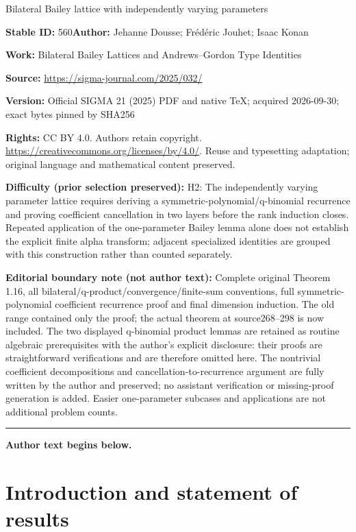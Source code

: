 \documentclass[11pt]{article}
\numberwithin{equation}{section}
\begin{document}
\begin{center}\Large Bilateral Bailey lattice with independently varying parameters\end{center}
\noindent\textbf{Stable ID:} 560\quad\textbf{Author:} Jehanne Dousse; Frédéric Jouhet; Isaac Konan\par
\noindent\textbf{Work:} Bilateral Bailey Lattices and Andrews–Gordon Type Identities\par
\noindent\textbf{Source:} \url{https://sigma-journal.com/2025/032/}\par
\noindent\textbf{Version:} Official SIGMA 21 (2025) PDF and native TeX; acquired 2026-09-30; exact bytes pinned by SHA256\par
\noindent\textbf{Rights:} CC BY 4.0. Authors retain copyright. \url{https://creativecommons.org/licenses/by/4.0/}. Reuse and typesetting adaptation; original language and mathematical content preserved.\par
\noindent\textbf{Difficulty (prior selection preserved):} {\CJKfont H2: The independently varying parameter lattice requires deriving a symmetric-polynomial/q-binomial recurrence and proving coefficient cancellation in two layers before the rank induction closes. Repeated application of the one-parameter Bailey lemma alone does not establish the explicit finite alpha transform; adjacent specialized identities are grouped with this construction rather than counted separately.}\par
\medskip\noindent\textbf{Editorial boundary note (not author text):} Complete original Theorem 1.16, all bilateral/q-product/convergence/finite-sum conventions, full symmetric-polynomial coefficient recurrence proof and final dimension induction. The old range contained only the proof; the actual theorem at source268–298 is now included. The two displayed q-binomial product lemmas are retained as routine algebraic prerequisites with the author’s explicit disclosure: their proofs are straightforward verifications and are therefore omitted here. The nontrivial coefficient decompositions and cancellation-to-recurrence argument are fully written by the author and preserved; no assistant verification or missing-proof generation is added. Easier one-parameter subcases and applications are not additional problem counts.\par
\medskip\hrule\medskip\noindent\textbf{Author text begins below.}\par
\setcounter{section}{0}
\section{Introduction and statement of results}\label{sec:intro}
\end{document}
